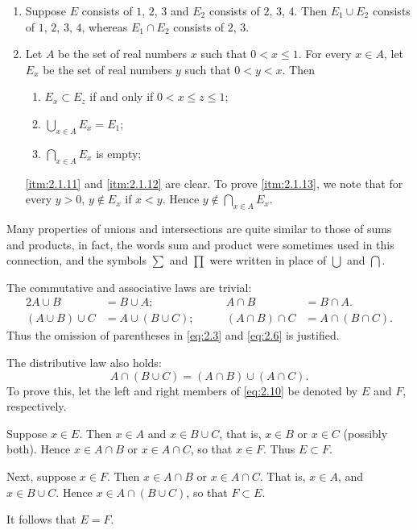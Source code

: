 \begin{example}
    \leavevmode
    \begin{enumerate}
        \item Suppose \(E\) consists of \(1\), \(2\), \(3\) and \(E_2\) consists of \(2\), \(3\), \(4\). Then \(E_1\cup E_2\) consists of \(1\), \(2\), \(3\), \(4\), whereas \(E_1\cap E_2\) consists of \(2\), \(3\).
        \item Let \(A\) be the set of real numbers \(x\) such that \(0<x\leqslant1\). For every \(x\in A\), let \(E_x\) be the set of real numbers \(y\) such that \(0<y<x\). Then
        \begin{enumerate}
            \item\label{itm:2.1.11} \(E_x\subset E_z\) if and only if \(0<x\leqslant z\leqslant1\);
            \item\label{itm:2.1.12} \(\bigcup_{x\in A}E_x=E_1\);
            \item\label{itm:2.1.13} \(\bigcap_{x\in A}E_x\) is empty;
        \end{enumerate}
        \ref{itm:2.1.11} and \ref{itm:2.1.12} are clear. To prove \ref{itm:2.1.13}, we note that for every \(y>0\), \(y\notin E_x\) if \(x<y\). Hence \(y\notin\bigcap_{x\in A}E_x\).
    \end{enumerate}
\end{example}

\begin{remarks}
    Many properties of unions and intersections are quite similar to those of sums and products, in fact, the words sum and product were sometimes used in this connection, and the symbols \(\sum\) and \(\prod\) were written in place of \(\bigcup\) and \(\bigcap\).

    The commutative and associative laws are trivial:
    \begin{alignat}{2}
        A\cup B&=B\cup A;\qquad&A\cap B&=B\cap A.\\
        \left(A\cup B\right)\cup C&=A\cup\left(B\cup C\right);\qquad&\left(A\cap B\right)\cap C&=A\cap\left(B\cap C\right).
    \end{alignat}
    Thus the omission of parentheses in \eqref{eq:2.3} and \eqref{eq:2.6} is justified.

    The distributive law also holds:
    \begin{equation}
        A\cap\left(B\cup C\right)=\left(A\cap B\right)\cup\left(A\cap C\right).\label{eq:2.10}
    \end{equation}
    To prove this, let the left and right members of \eqref{eq:2.10} be denoted by \(E\) and \(F\), respectively.

    Suppose \(x\in E\). Then \(x\in A\) and \(x\in B\cup C\), that is, \(x\in B\) or \(x\in C\) (possibly both). Hence \(x\in A\cap B\) or \(x\in A\cap C\), so that \(x\in F\). Thus \(E\subset F\).

    Next, suppose \(x\in F\). Then \(x\in A\cap B\) or \(x\in A\cap C\). That is, \(x\in A\), and \(x\in B\cup C\). Hence \(x\in A\cap\left(B\cup C\right)\), so that \(F\subset E\).

    It follows that \(E=F\).
\end{remarks}

